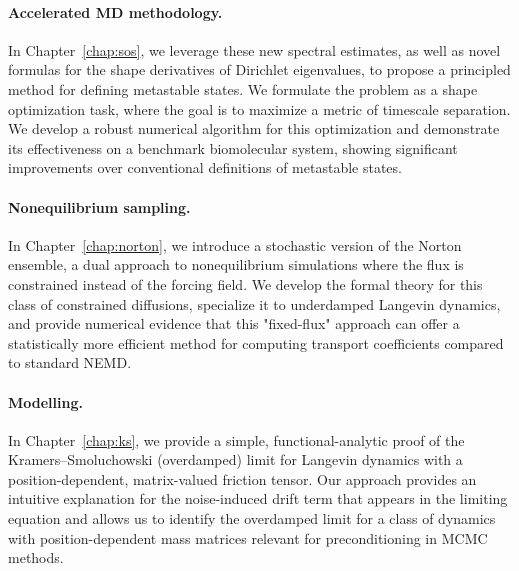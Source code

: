 \paragraph{Accelerated MD methodology.} In Chapter~\ref{chap:sos}, we leverage these new spectral estimates, as well as novel formulas for the shape derivatives of Dirichlet eigenvalues, to propose a principled method for defining metastable states. We formulate the problem as a shape optimization task, where the goal is to maximize a metric of timescale separation. We develop a robust numerical algorithm for this optimization and demonstrate its effectiveness on a benchmark biomolecular system, showing significant improvements over conventional definitions of metastable states.
\paragraph{Nonequilibrium sampling.} In Chapter~\ref{chap:norton}, we introduce a stochastic version of the Norton ensemble, a dual approach to nonequilibrium simulations where the flux is constrained instead of the forcing field. We develop the formal theory for this class of constrained diffusions, specialize it to underdamped Langevin dynamics, and provide numerical evidence that this "fixed-flux" approach can offer a statistically more efficient method for computing transport coefficients compared to standard NEMD.
\paragraph{Modelling.} In Chapter~\ref{chap:ks}, we provide a simple, functional-analytic proof of the Kramers--Smoluchowski (overdamped) limit for Langevin dynamics with a position-dependent, matrix-valued friction tensor. Our approach provides an intuitive explanation for the noise-induced drift term that appears in the limiting equation and allows us to identify the overdamped limit for a class of dynamics with position-dependent mass matrices relevant for preconditioning in MCMC methods.
